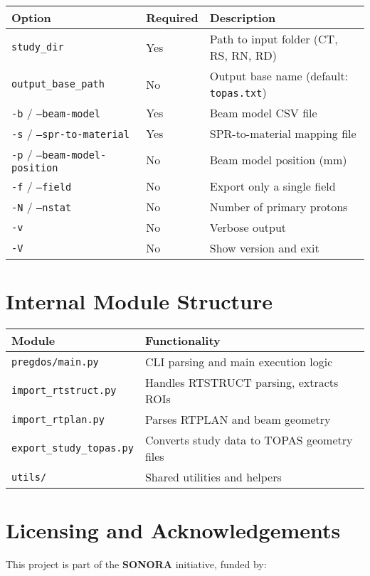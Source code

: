 \documentclass[11pt]{article}
\begin{document}
\begin{longtable}{|l|l|p{8cm}|}
\hline
\textbf{Option} & \textbf{Required} & \textbf{Description} \\
\hline
\texttt{study\_dir} & Yes & Path to input folder (CT, RS, RN, RD) \\
\texttt{output\_base\_path} & No & Output base name (default: \texttt{topas.txt}) \\
\texttt{-b} / \texttt{--beam-model} & Yes & Beam model CSV file \\
\texttt{-s} / \texttt{--spr-to-material} & Yes & SPR-to-material mapping file \\
\texttt{-p} / \texttt{--beam-model-position} & No & Beam model position (mm) \\
\texttt{-f} / \texttt{--field} & No & Export only a single field \\
\texttt{-N} / \texttt{--nstat} & No & Number of primary protons \\
\texttt{-v} & No & Verbose output \\
\texttt{-V} & No & Show version and exit \\
\hline
\end{longtable}


\section{Internal Module Structure}

\begin{longtable}{|l|p{10cm}|}
\hline
\textbf{Module} & \textbf{Functionality} \\
\hline
\texttt{pregdos/main.py} & CLI parsing and main execution logic \\
\texttt{import\_rtstruct.py} & Handles RTSTRUCT parsing, extracts ROIs \\
\texttt{import\_rtplan.py} & Parses RTPLAN and beam geometry \\
\texttt{export\_study\_topas.py} & Converts study data to TOPAS geometry files \\
\texttt{utils/} & Shared utilities and helpers \\
\hline
\end{longtable}



\section{Licensing and Acknowledgements}

This project is part of the \textbf{SONORA} initiative, funded by:
\end{document}
